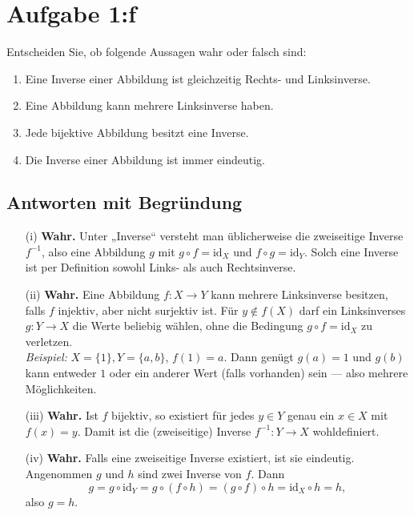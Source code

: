 \documentclass{article}
\begin{document}
\section*{Aufgabe 1:f}
Entscheiden Sie, ob folgende Aussagen wahr oder falsch sind:
\begin{enumerate}[label=(\roman*)]
    \item Eine Inverse einer Abbildung ist gleichzeitig Rechts- und Linksinverse.
    \item Eine Abbildung kann mehrere Linksinverse haben.
    \item Jede bijektive Abbildung besitzt eine Inverse.
    \item Die Inverse einer Abbildung ist immer eindeutig.
\end{enumerate}

\subsection*{Antworten mit Begründung}

\begin{itemize}
    \item[(i)] \textbf{Wahr.} Unter „Inverse“ versteht man üblicherweise die zweiseitige Inverse \(f^{-1}\), also eine Abbildung \(g\) mit \(g\circ f=\mathrm{id}_X\) und \(f\circ g=\mathrm{id}_Y\). Solch eine Inverse ist per Definition sowohl Links- als auch Rechtsinverse.

    \item[(ii)] \textbf{Wahr.} Eine Abbildung \(f\colon X\to Y\) kann mehrere Linksinverse besitzen, falls \(f\) injektiv, aber nicht surjektiv ist. Für \(y\notin f(X)\) darf ein Linksinverses \(g\colon Y\to X\) die Werte beliebig wählen, ohne die Bedingung \(g\circ f=\mathrm{id}_X\) zu verletzen. \\
        \emph{Beispiel:} \(X=\{1\}, Y=\{a,b\}\), \(f(1)=a\). Dann genügt \(g(a)=1\) und \(g(b)\) kann entweder \(1\) oder ein anderer Wert (falls vorhanden) sein — also mehrere Möglichkeiten.

    \item[(iii)] \textbf{Wahr.} Ist \(f\) bijektiv, so existiert für jedes \(y\in Y\) genau ein \(x\in X\) mit \(f(x)=y\). Damit ist die (zweiseitige) Inverse \(f^{-1}\colon Y\to X\) wohldefiniert.

    \item[(iv)] \textbf{Wahr.} Falls eine zweiseitige Inverse existiert, ist sie eindeutig. Angenommen \(g\) und \(h\) sind zwei Inverse von \(f\). Dann
        \[
            g = g\circ\mathrm{id}_Y = g\circ(f\circ h) = (g\circ f)\circ h = \mathrm{id}_X\circ h = h,
        \]
        also \(g=h\).
\end{itemize}
\end{document}
